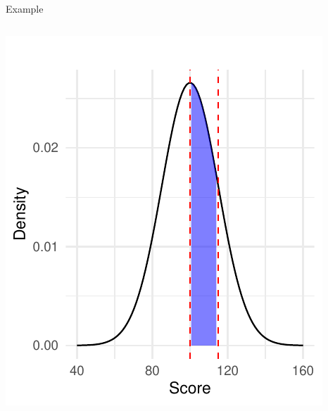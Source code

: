 \documentclass[
  ignorenonframetext,
]{beamer}
\begin{document}
\begin{frame}[fragile]{Example}
\begin{columns}[T]
\begin{column}{0.5\textwidth}
\includegraphics{M5-Hypothesis-Testing,-Probability-and-Distribution_files/figure-beamer/unnamed-chunk-23-1.pdf}
\end{column}
\end{columns}
\end{frame}
\end{document}
